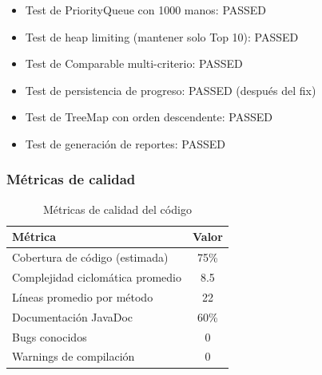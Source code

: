 \documentclass[12pt,a4paper]{article}
\begin{document}
\begin{itemize}
    \item Test de PriorityQueue con 1000 manos: PASSED
    \item Test de heap limiting (mantener solo Top 10): PASSED
    \item Test de Comparable multi-criterio: PASSED
    \item Test de persistencia de progreso: PASSED (después del fix)
    \item Test de TreeMap con orden descendente: PASSED
    \item Test de generación de reportes: PASSED
\end{itemize}

\subsubsection{Métricas de calidad}

\begin{table}[H]
\centering
\begin{tabular}{|l|c|}
\hline
\textbf{Métrica} & \textbf{Valor} \\
\hline
Cobertura de código (estimada) & 75\% \\
Complejidad ciclomática promedio & 8.5 \\
Líneas promedio por método & 22 \\
Documentación JavaDoc & 60\% \\
Bugs conocidos & 0 \\
Warnings de compilación & 0 \\
\hline
\end{tabular}
\caption{Métricas de calidad del código}
\end{table}
\end{document}
